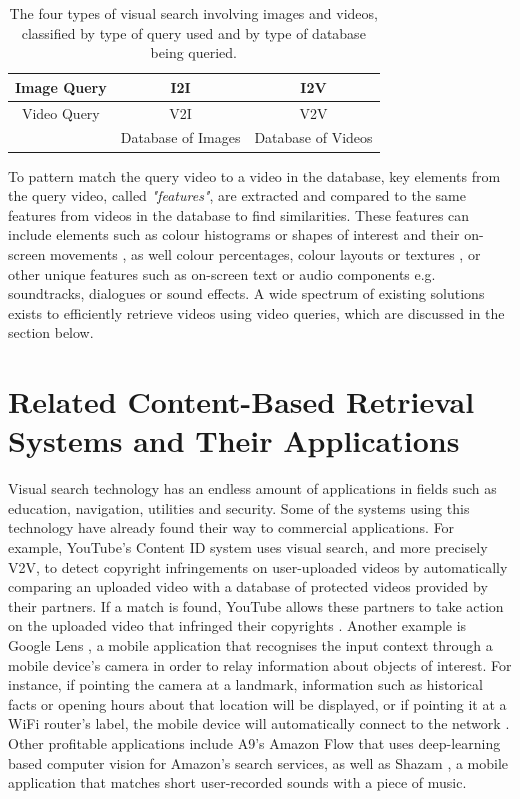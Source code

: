 \begin{table}[H]
\centering
\begin{tabular}{c|c|c|}
\hline
\multicolumn{1}{|c|}{Image Query} & I2I                & I2V                \\ \hline
\multicolumn{1}{|c|}{Video Query} & V2I                & V2V                \\ \hline
\multicolumn{1}{l|}{}             & Database of Images & Database of Videos \\ \cline{2-3} 
\end{tabular}
\caption{The four types of visual search involving images and videos, classified by type of query used and by type of database being queried.}
\label{table:visual_search_table}
\end{table}

To pattern match the query video to a video in the database, key elements from the query video, called \textit{"features"}, are extracted and compared to the same features from videos in the database to find similarities. These features can include elements such as colour histograms or shapes of interest and their on-screen movements \cite{patel2012}, as well colour percentages, colour layouts or textures \cite{petkovic2000}, or other unique features such as on-screen text or audio components e.g. soundtracks, dialogues or sound effects. A wide spectrum of existing solutions exists to efficiently retrieve videos using video queries, which are discussed in the section below.

\section{Related Content-Based Retrieval Systems and Their Applications}
\label{sec:v2v_applications}

Visual search technology has an endless amount of applications in fields such as education, navigation, utilities and security. Some of the systems using this technology have already found their way to commercial applications. For example, YouTube's Content ID system uses visual search, and more precisely V2V, to detect copyright infringements on user-uploaded videos by automatically comparing an uploaded video with a database of protected videos provided by their partners. If a match is found, YouTube allows these partners to take action on the uploaded video that infringed their copyrights \cite{youtube-content-id-2012}. Another example is Google Lens \cite{google-lens}, a mobile application that recognises the input context through a mobile device's camera in order to relay information about objects of interest. For instance, if pointing the camera at a landmark, information such as historical facts or opening hours about that location will be displayed, or if pointing it at a WiFi router's label, the mobile device will automatically connect to the network \cite{villaboas-google-lens2017}. Other profitable applications include A9's Amazon Flow \cite{a9-visual-search} that uses deep-learning based computer vision for Amazon's search services, as well as Shazam \cite{shazam}, a mobile application that matches short user-recorded sounds with a piece of music.\\

